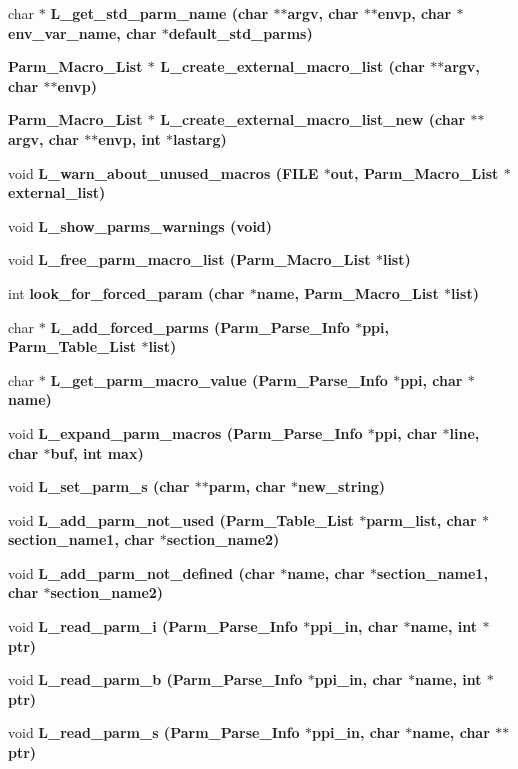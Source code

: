 \begin{CompactItemize}
\item 
char $\ast$ \bf{L\_\-get\_\-std\_\-parm\_\-name} (char $\ast$$\ast$argv, char $\ast$$\ast$envp, char $\ast$env\_\-var\_\-name, char $\ast$default\_\-std\_\-parms)
\item 
\bf{Parm\_\-Macro\_\-List} $\ast$ \bf{L\_\-create\_\-external\_\-macro\_\-list} (char $\ast$$\ast$argv, char $\ast$$\ast$envp)
\item 
\bf{Parm\_\-Macro\_\-List} $\ast$ \bf{L\_\-create\_\-external\_\-macro\_\-list\_\-new} (char $\ast$$\ast$argv, char $\ast$$\ast$envp, int $\ast$lastarg)
\item 
void \bf{L\_\-warn\_\-about\_\-unused\_\-macros} (FILE $\ast$out, \bf{Parm\_\-Macro\_\-List} $\ast$external\_\-list)
\item 
void \bf{L\_\-show\_\-parms\_\-warnings} (void)
\item 
void \bf{L\_\-free\_\-parm\_\-macro\_\-list} (\bf{Parm\_\-Macro\_\-List} $\ast$\bf{list})
\item 
int \bf{look\_\-for\_\-forced\_\-param} (char $\ast$\bf{name}, \bf{Parm\_\-Macro\_\-List} $\ast$\bf{list})
\item 
char $\ast$ \bf{L\_\-add\_\-forced\_\-parms} (\bf{Parm\_\-Parse\_\-Info} $\ast$ppi, \bf{Parm\_\-Table\_\-List} $\ast$\bf{list})
\item 
char $\ast$ \bf{L\_\-get\_\-parm\_\-macro\_\-value} (\bf{Parm\_\-Parse\_\-Info} $\ast$ppi, char $\ast$\bf{name})
\item 
void \bf{L\_\-expand\_\-parm\_\-macros} (\bf{Parm\_\-Parse\_\-Info} $\ast$ppi, char $\ast$line, char $\ast$buf, int max)
\item 
void \bf{L\_\-set\_\-parm\_\-s} (char $\ast$$\ast$parm, char $\ast$new\_\-string)
\item 
void \bf{L\_\-add\_\-parm\_\-not\_\-used} (\bf{Parm\_\-Table\_\-List} $\ast$parm\_\-list, char $\ast$section\_\-name1, char $\ast$section\_\-name2)
\item 
void \bf{L\_\-add\_\-parm\_\-not\_\-defined} (char $\ast$\bf{name}, char $\ast$section\_\-name1, char $\ast$section\_\-name2)
\item 
void \bf{L\_\-read\_\-parm\_\-i} (\bf{Parm\_\-Parse\_\-Info} $\ast$ppi\_\-in, char $\ast$\bf{name}, int $\ast$ptr)
\item 
void \bf{L\_\-read\_\-parm\_\-b} (\bf{Parm\_\-Parse\_\-Info} $\ast$ppi\_\-in, char $\ast$\bf{name}, int $\ast$ptr)
\item 
void \bf{L\_\-read\_\-parm\_\-s} (\bf{Parm\_\-Parse\_\-Info} $\ast$ppi\_\-in, char $\ast$\bf{name}, char $\ast$$\ast$ptr)

\end{CompactItemize}
